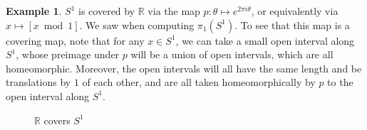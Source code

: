 \documentclass{article}
\theoremstyle{definition}
\newtheorem{exa}[thm]{Example}
\theoremstyle{remark}
\newcommand{\R}{\mathbb R}
\numberwithin{figure}{section}
\begin{document}
\begin{exa}
	$S^1$ is covered by $\R$ via the map $p : \theta \mapsto e^{2\pi i\theta}$, or equivalently via $x \mapsto [x \bmod{1}]$. We saw when computing $\pi_1(S^1)$. To see that this map is a covering map, note that for any $x \in S^1$, we can take a small open interval along $S^1$, whose preimage under $p$ will be a union of open intervals, which are all homeomorphic. Moreover, the open intervals will all have the same length and be translations by $1$ of each other, and are all taken homeomorphically by $p$ to the open interval along $S^1$.
	
	\begin{figure}[h]
		\centering
		\caption{$\R$ covers $S^1$}
		\label{fig:R cover S1}
	\end{figure}

\end{exa}
\end{document}
